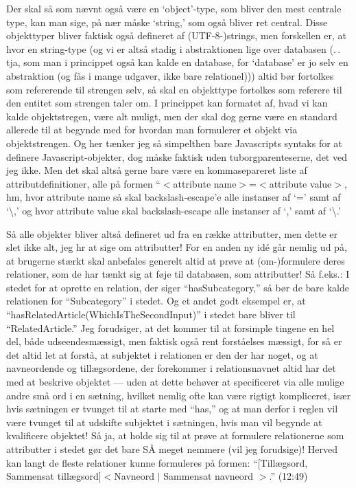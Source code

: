 \documentclass{report}
\begin{document}
Der skal så som nævnt også være en `object'-type, som bliver den mest centrale type, kan man sige, på nær måske `string,' som også bliver ret central. Disse objekttyper bliver faktisk også defineret af (UTF-8-)strings, men forskellen er, at hvor en string-type (og vi er altså stadig i abstraktionen lige over databasen (.\,.\,tja, som man i princippet også kan kalde en database, for `database' er jo selv en abstraktion (og fås i mange udgaver, ikke bare relationel))) altid bør fortolkes som refererende til strengen selv, så skal en objekttype fortolkes som referere til den entitet som strengen taler om. I princippet kan formatet af, hvad vi kan kalde objektstregen, være alt muligt, men der skal dog gerne være en standard allerede til at begynde med for hvordan man formulerer et objekt via objektstrengen. Og her tænker jeg så simpelthen bare Javascripts syntaks for at definere Javascript-objekter, dog måske faktisk uden tuborgparenteserne, det ved jeg ikke. Men det skal altså gerne bare være en kommasepareret liste af attributdefinitioner, alle på formen ``$<$attribute name$>$=$<$attribute value$>$, hm, hvor attribute name så skal backslash-escape'e alle instanser af `=' samt af `\textbackslash,' og hvor attribute value skal backslash-escape alle instanser af `,' samt af `\textbackslash.'

Så alle objekter bliver altså defineret ud fra en række attributter, men dette er slet ikke alt, jeg hr at sige om attributter! For en anden ny idé går nemlig ud på, at brugerne stærkt skal anbefales generelt altid at prøve at (om-)formulere deres relationer, som de har tænkt sig at føje til databasen, som attributter! Så f.eks.: I stedet for at oprette en relation, der siger ``hasSubcategory,'' så bør de bare kalde relationen for ``Subcategory'' i stedet. Og et andet godt eksempel er, at ``hasRelatedArticle(WhichIsTheSecondInput)'' i stedet bare bliver til ``RelatedArticle.'' Jeg forudsiger, at det kommer til at forsimple tingene en hel del, både udseendesmæssigt, men faktisk også rent forståelses mæssigt, for så er det altid let at forstå, at subjektet i relationen er den der har noget, og at navneordende og tillægsordene, der forekommer i relationsnavnet altid har det med at beskrive objektet --- uden at dette behøver at specificeret via alle mulige andre små ord i en sætning, hvilket nemlig ofte kan være rigtigt kompliceret, især hvis sætningen er tvunget til at starte med ``has,'' og at man derfor i reglen vil være tvunget til at udskifte subjektet i sætningen, hvis man vil begynde at kvalificere objektet! Så ja, at holde sig til at prøve at formulere relationerne som attributter i stedet gør det bare SÅ meget nemmere (vil jeg forudsige)! Herved kan langt de fleste relationer kunne formuleres på formen: ``[Tillægsord, Sammensat tillægsord]$<$Navneord $|$ Sammensat navneord $>$.'' (12:49)
\end{document}
